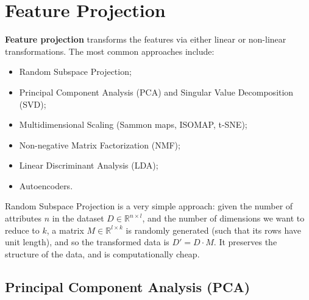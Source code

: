 \section{Feature Projection}

\textbf{Feature projection} transforms the features via either linear or non-linear transformations. The most common approaches include:
\begin{itemize}
    \item Random Subspace Projection;

    \item Principal Component Analysis (PCA) and Singular Value Decomposition (SVD);
    
    \item Multidimensional Scaling (Sammon maps, ISOMAP, t-SNE);

    \item Non-negative Matrix Factorization (NMF);

    \item Linear Discriminant Analysis (LDA);

    \item Autoencoders.
\end{itemize}
Random Subspace Projection is a very simple approach: given the number of attributes $n$ in the dataset $D \in \mathbb{R}^{n \times l}$, and the number of dimensions we want to reduce to $k$, a matrix $M \in \mathbb{R}^{l \times k}$ is randomly generated (such that its rows have unit length), and so the transformed data is $D' = D \cdot M$. It preserves the structure of the data, and is computationally cheap.

\subsection{Principal Component Analysis (PCA)}


